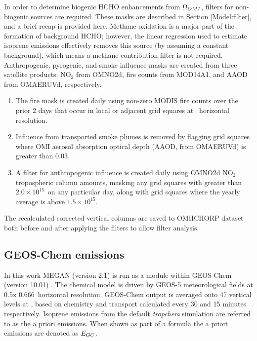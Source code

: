     In order to determine biogenic HCHO enhancements from $\Omega_{OMI}$, filters for non-biogenic sources are required.
    These masks are described in Section \ref{Model:filter}, and a brief recap is provided here.
    Methane oxidation is a major part of the formation of background HCHO; however, the linear regression used to estimate isoprene emissions effectively removes this source (by assuming a constant background), which means a methane contribution filter is not required.
    Anthropogenic, pyrogenic, and smoke influence masks are created from three satellite products: NO$_2$ from OMNO2d, fire counts from MOD14A1, and AAOD from OMAERUVd, respectively.
    \begin{enumerate}
      \item 
      The fire mask is created daily using non-zero MODIS fire counts over the prior 2 days that occur in local or adjacent grid squares at \highhr ~horizontal resolution.
      \item 
      Influence from transported smoke plumes is removed by flagging grid squares where OMI aerosol absorption optical depth (AAOD, from OMAERUVd) is greater than 0.03.
      \item 
      A filter for anthropogenic influence is created daily using OMNO2d NO$_2$ tropospheric column amounts, masking any grid squares with greater than $2.0 \times 10^{15}$\moleccm ~on any particular day, along with grid squares where the yearly average is above $1.5 \times 10^{15}$\moleccm.
    \end{enumerate}
    The recalculated corrected vertical columns are saved to OMHCHORP dataset both before and after applying the filters to allow filter analysis.
    
    
  \subsection{GEOS-Chem emissions}
    
    In this work MEGAN (version 2.1) is run as a module within GEOS-Chem (version 10.01) .
    The chemical model is driven by GEOS-5 meteorological fields at 0.5\degr x 0.666\degr ~horizontal resolution.
    GEOS-Chem output is averaged onto 47 vertical levels at \lowhr, based on chemistry and transport calculated every 30 and 15 minutes respectively.
    Isoprene emissions from the default \textit{tropchem} simulation are referred to as the a priori emissions.
    When shown as part of a formula the a priori emissions are denoted as $E_{GC}$.
    
